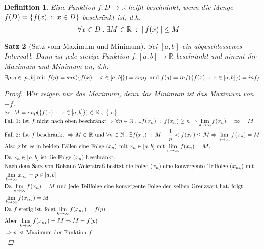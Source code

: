 \documentclass[a4paper,titlepage,oneside]{article}
\def\N{\ensuremath{\mathbb{N}} }
\def\R{\ensuremath{\mathbb{R}} }
\def\sp{\hspace{0,1cm}}
\def\spdot{\sp.\sp}
\def\spcolon{\sp:\sp}
\renewcommand{\liminf}[2][n]{\ensuremath{\lim\limits_{#1 \rightarrow \infty}{#2}}}
\newcommand{\abs}[1]{\ensuremath{\left|\:#1\:\right|}}
\newcommand{\menge}[2]{\ensuremath{\left\{#1\sp : \sp #2\right\}}}
\theoremstyle{thmstyle}
\newtheorem{satz}{Satz}[section]
\newtheorem{defi}[satz]{Definition}
\theoremstyle{subthmstyle}
\begin{document}
\begin{defi}
Eine Funktion $f: D \to \R$ heißt beschränkt, wenn die Menge $f(D) = \menge{f(x)}{x \in D}$ beschränkt ist, d.h.
\[\forall x\in D \spdot \exists M \in \R \spcolon \abs{f(x)} \le M \quad\]
\end{defi}

\begin{satz}[Satz vom Maximum und Minimum]
Sei $[a,b]$ ein abgeschlossenes Intervall. Dann ist jede stetige Funktion $f: [a,b] \to \R$ beschränkt und nimmt ihr Maximum und Minimum an, d.h.
\[\exists p,q \in [a,b] \text{ mit } f(p) = sup(\menge{f(x)}{x\in[a,b]}) = sup_f \text{ und } f(q) = inf(\menge{f(x)}{x\in[a,b]}) = inf_f\]

\begin{proof}
Wir zeigen nur das Maximum, denn das Minimum ist das Maximum von $-f$.\\
\begin{math}\displaystyle \begin{aligned}[t] 
&\text{Sei } M = sup(\menge{f(x)}{x\in[a,b]}) \in \R \cup \{\infty\} \\
&\text{Fall 1: Ist $f$ nicht nach oben beschränkt} \Rightarrow \forall n \in \N \spdot \exists f(x_n) \spcolon f(x_n) \ge n \Rightarrow \liminf{f(x_n)} = \infty = M \\
&\text{Fall 2: Ist $f$ beschränkt } \Rightarrow M \in \R \text{ und } \forall n \in \N \spdot \exists f(x_n) \spcolon M-\frac{1}{n} < f(x_n) \le M \Rightarrow \liminf{f(x_n)} = M \\
&\text{Also gibt es in beiden Fällen eine Folge $(x_n)$ mit $x_n \in [a,b]$ mit $\liminf{f(x_n)} = M$.} \\
&\text{Da $x_n \in [a,b]$ ist die Folge $(x_n)$ beschränkt.} \\
&\text{Nach dem Satz von Bolzano-Weierstraß besitzt die Folge $(x_n)$ eine konvergente Teilfolge $(x_{n_k})$ mit} \\
&\liminf[k]{x_{n_k}} = p \in [a,b] \\
&\text{Da $\liminf{f(x_n)} = M$ und jede Teilfolge eine konvergente Folge den selben Grenzwert hat, folgt} \\ &\liminf[k]{f(x_{n_k})} = M \\
&\text{Da $f$ stetig ist, folgt} \liminf[k]{f(x_{n_k})} = f(p) \\
&\text{Aber } \liminf[k]{f(x_{n_k})} = M \Rightarrow M = f(p) \\
&\Rightarrow p \text{ ist Maximum der Funktion } f
\end{aligned}\end{math} 
\end{proof}
\end{satz}
\end{document}
